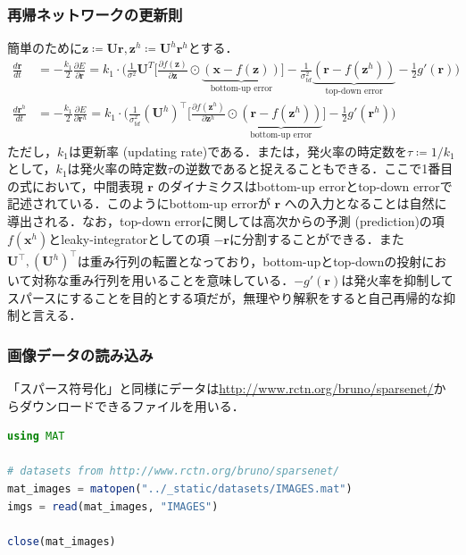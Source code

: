 \subsubsection{再帰ネットワークの更新則}
簡単のために$\mathbf{z}\coloneqq \mathbf{U}\mathbf{r}, \mathbf{z}^h\coloneqq \mathbf{U}^h\mathbf{r}^h$とする．
\begin{align}
\frac{d \mathbf{r}}{d t}&=-\frac{k_{1}}{2} \frac{\partial E}{\partial \mathbf{r}}=k_{1}\cdot\Bigg(\frac{1}{\sigma^{2}} \mathbf{U}^{T}\bigg[\frac{\partial f(\mathbf{z})}{\partial \mathbf{z}}\odot\underbrace{(\mathbf{x}-f(\mathbf{z}))}_{\text{bottom-up error}}\bigg]-\frac{1}{\sigma_{t d}^{2}}\underbrace{\left(\mathbf{r}-f(\mathbf{z}^h)\right)}_{\text{top-down error}}-\frac{1}{2}g'(\mathbf{r})\Bigg)\\
\frac{d \mathbf{r}^h}{d t}&=-\frac{k_{1}}{2} \frac{\partial E}{\partial \mathbf{r}^h}=k_{1}\cdot\Bigg(\frac{1}{\sigma_{t d}^{2}}(\mathbf{U}^h)^\top\bigg[\frac{\partial f(\mathbf{z}^h)}{\partial \mathbf{z}^h}\odot\underbrace{\left(\mathbf{r}-f(\mathbf{z}^h)\right)}_{\text{bottom-up error}}\bigg]-\frac{1}{2}g'(\mathbf{r}^h)\Bigg)
\end{align}
ただし，$k_1$は更新率 (updating rate)である．または，発火率の時定数を$\tau\coloneqq 1/k_1$として，$k_1$は発火率の時定数$\tau$の逆数であると捉えることもできる．ここで1番目の式において，中間表現 $\mathbf{r}$ のダイナミクスはbottom-up errorとtop-down errorで記述されている．このようにbottom-up errorが $\mathbf{r}$ への入力となることは自然に導出される．なお，top-down errorに関しては高次からの予測 (prediction)の項 $f(\mathbf{x}^h)$とleaky-integratorとしての項 $-\mathbf{r}$に分割することができる．また$\mathbf{U}^\top, (\mathbf{U}^h)^\top$は重み行列の転置となっており，bottom-upとtop-downの投射において対称な重み行列を用いることを意味している．$-g'(\mathbf{r})$は発火率を抑制してスパースにすることを目的とする項だが，無理やり解釈をすると自己再帰的な抑制と言える．
\subsubsection{画像データの読み込み}
「スパース符号化」と同様にデータは\url{http://www.rctn.org/bruno/sparsenet/}からダウンロードできるファイルを用いる．
\begin{lstlisting}[language=julia]
using MAT

# datasets from http://www.rctn.org/bruno/sparsenet/
mat_images = matopen("../_static/datasets/IMAGES.mat")
imgs = read(mat_images, "IMAGES")

close(mat_images)
\end{lstlisting}
